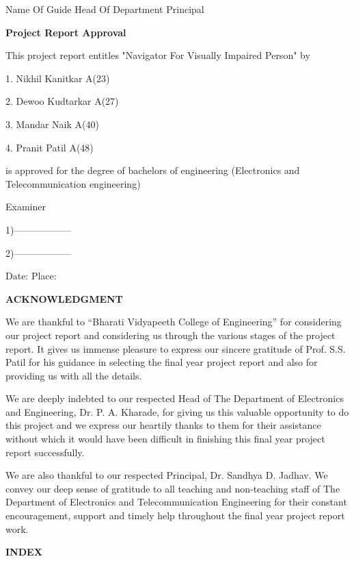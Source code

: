 \documentclass{article}
\begin{document}
Name Of Guide Head Of Department Principal

\textbf{Project Report Approval}

This project report entitles "Navigator For Visually Impaired Person" by

1. Nikhil Kanitkar A(23)

2. Dewoo Kudtarkar A(27)

3. Mandar Naik A(40)

4. Pranit Patil A(48)

is approved for the degree of bachelors of engineering (Electronics and
Telecommunication engineering)

Examiner

1)------------------

2)------------------

Date: Place:

\textbf{ACKNOWLEDGMENT}

We are thankful to ``Bharati Vidyapeeth College of Engineering'' for
considering our project report and considering us through the various
stages of the project report. It gives us immense pleasure to express
our sincere gratitude of Prof. S.S. Patil for his guidance in selecting
the final year project report and also for providing us with all the
details.

We are deeply indebted to our respected Head of The Department of
Electronics and Engineering, Dr. P. A. Kharade, for giving us this
valuable opportunity to do this project and we express our heartily
thanks to them for their assistance without which it would have been
difficult in finishing this final year project report successfully.

We are also thankful to our respected Principal, Dr. Sandhya D. Jadhav.
We convey our deep sense of gratitude to all teaching and non-teaching
staff of The Department of Electronics and Telecommunication Engineering
for their constant encouragement, support and timely help throughout the
final year project report work.

\textbf{INDEX}
\end{document}
